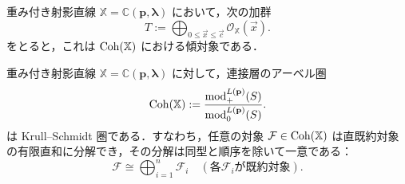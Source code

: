 \begin{thm}\cite{GL87}
重み付き射影直線 $\mathbb{X} = \mathbb{C}(\mathbf{p}, \boldsymbol{\lambda})$ において，次の加群
\[
T := \bigoplus_{0 \le \vec{x} \le \vec{c}} \mathcal{O}_{\mathbb{X}}(\vec{x}).
\]
をとると，これは $\operatorname{\mathrm{Coh}}(\mathbb{X})$ における傾対象である．
\end{thm}


\begin{thm}\cite{GL87}
重み付き射影直線 $\mathbb{X} = \mathbb{C}(\mathbf{p}, \boldsymbol{\lambda})$ に対して，連接層のアーベル圏
\[
\operatorname{\mathrm{Coh}}(\mathbb{X}) := \frac{\mathrm{mod}_+^{L(\mathbf{p})}(S)}{\mathrm{mod}_0^{L(\mathbf{p})}(S)}.
\]
は Krull--Schmidt 圏である．すなわち，任意の対象 $\mathcal{F} \in \operatorname{\mathrm{Coh}}(\mathbb{X})$ は直既約対象の有限直和に分解でき，その分解は同型と順序を除いて一意である：
\[
\mathcal{F} \cong \bigoplus_{i=1}^n \mathcal{F}_i \quad (\text{各} \mathcal{F}_i \text{が既約対象}).
\]
\end{thm}

